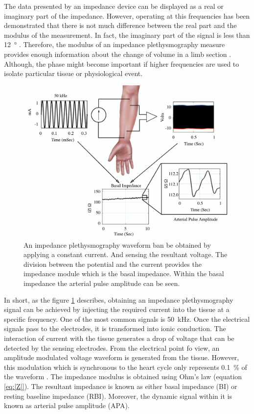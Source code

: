 The data presented by an impedance device can be displayed as a real or imaginary part of the impedance. However, operating at this frequencies has been demonstrated that there is not much difference between the real part and the modulus of the measurement. In fact, the imaginary part of the signal is less than \SI{12}{\degree} \cite{jaffrin1979quantitative}. Therefore, the modulus of an impedance plethysmography measure provides enough information about the change of volume in a limb section \cite{anderson1984impedance}. Although, the phase might become important if higher frequencies are used to isolate particular tissue or physiological event.

\begin{figure}[!htpb]
	\centering
	\includegraphics[width=\textwidth,keepaspectratio]{figure15}    
	\caption[How to get an impedance plethysmography waveform]{An impedance plethysmography waveform ban be obtained by applying a constant current. And sensing the resultant voltage. The division between the potential and the current provides the impedance module which is the basal impedance. Within the basal impedance the arterial pulse amplitude can be seen.}
	\label{fig:envelope iPG}
\end{figure}

In short, as the figure \ref{fig:envelope iPG} describes, obtaining an impedance plethysmography signal can be achieved by injecting the required current into the tissue at a specific frequency. One of the most common signals is \SI{50}{\kilo\hertz}. Once the electrical signals pass to the electrodes,  it is transformed into ionic conduction. The interaction of current with the tissue generates a drop of voltage that can be detected by the sensing electrodes. From the electrical point fo view, an amplitude modulated voltage waveform is generated from the tissue. However, this modulation which is synchronous to the heart cycle only represents \SI{0.1}{\percent} of the waveform \cite{anderson1984impedance}. 
The impedance modulus is obtained using Ohm's law (equation \ref{eq:|Z|}). The resultant impedance is known as either basal impedance (BI) or resting baseline impedance (RBI). Moreover, the dynamic signal within it is known as arterial pulse amplitude (APA). 
 
